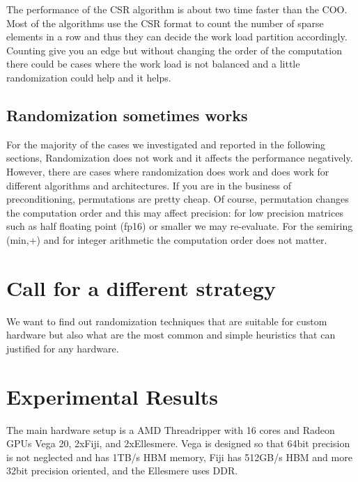 \documentclass[manuscript,screen]{acmart}
\begin{document}
The performance of the CSR algorithm is about two time faster than the
COO. Most of the algorithms use the CSR format to count the number of
sparse elements in a row and thus they can decide the work load
partition accordingly. Counting give you an edge but without changing
the order of the computation there could be cases where the work load
is not balanced and a little randomization could help and it helps.

\subsection{Randomization sometimes works}

For the majority of the cases we investigated and reported in the
following sections, Randomization does not work and it affects the
performance negatively. However, there are cases where randomization
does work and does work for different algorithms and architectures. If
you are in the business of preconditioning, permutations are pretty
cheap. Of course, permutation changes the computation order and this
may affect precision: for low precision matrices such as half floating
point (fp16) or smaller we may re-evaluate. For the semiring (min,+)
and for integer arithmetic the computation order does not matter.



\section{Call for a different strategy}
\label{sec:strategy}
We want to find out randomization techniques that are suitable for
custom hardware but also what are the most common and simple
heuristics that can justified for any hardware.


\section{Experimental Results}
\label{sec:experimentalresults}
The main hardware setup is a AMD Threadripper with 16 cores and Radeon
GPUs Vega 20, 2xFiji, and 2xEllesmere. Vega is designed so that 64bit
precision is not neglected and has 1TB/s HBM memory, Fiji has 512GB/s
HBM and more 32bit precision oriented, and the Ellesmere uses DDR.
\end{document}
